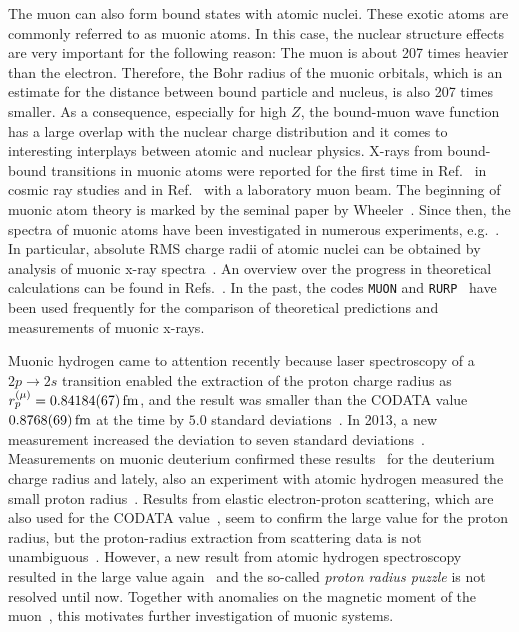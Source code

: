 The muon can also form bound states with atomic nuclei. These exotic atoms are commonly referred to as muonic atoms. In this case, the nuclear structure effects are very important for the following reason: The muon is about 207 times heavier than the electron. Therefore, the Bohr radius of the muonic orbitals, which is an estimate for the distance between bound particle and nucleus, is also 207 times smaller. As a consequence, especially for high $Z$, the bound-muon wave function has a large overlap with the nuclear charge distribution and it comes to interesting interplays between atomic and nuclear physics. X-rays from bound-bound transitions in muonic atoms were reported for the first time in Ref.~\cite{chang1949} in cosmic ray studies and in Ref.~\cite{fitch1953} with a laboratory muon beam. The beginning of muonic atom theory is marked by the seminal paper by Wheeler~\cite{wheeler1949}.  Since then, the spectra of muonic atoms have been investigated in numerous experiments, e.g.~\cite{hitlin1970,zehnder1975,powers1976,Yamazaki1978,tanaka1983,tanaka1984,tanaka1984_2,Bergem1988,
powers1977}. In particular, absolute RMS charge radii of atomic nuclei can be obtained by analysis of muonic x-ray spectra~\cite{FRICKE1995}. An overview over the progress in theoretical calculations can be found in Refs.~\cite{BorieRinker1982,Devons1995,wu1969}. In the past, the codes \texttt{MUON} and \texttt{RURP}~\cite{rinker1979} have been used frequently for the comparison of theoretical predictions and measurements of muonic x-rays.

Muonic hydrogen came to attention recently because laser spectroscopy of a \mbox{\small{$2p\rightarrow 2s$}} transition enabled the extraction of the proton charge radius as $r_p^{(\mu)}=0.84184(67)\,\rm{fm}$, and the result was smaller than the CODATA value $0.8768(69)\,\rm{fm}$ at the time by $5.0$ standard deviations~\cite{Pohl2010}. In 2013, a new measurement increased the deviation to seven standard deviations~\cite{antognini2013}. Measurements on muonic deuterium confirmed these results~\cite{pohl2016} for the deuterium charge radius and lately, also an experiment with atomic hydrogen measured the small proton radius~\cite{beyer2017}.
Results from elastic electron-proton scattering, which are also used for the CODATA value~\cite{CODATA2014}, seem to confirm the large value for the proton radius, but the proton-radius extraction from scattering data is not unambiguous~\cite{arrington2015}. However, a new result from atomic hydrogen spectroscopy resulted in the large value again~\cite{fleurbaey2018} and the so-called \textit{proton radius puzzle} is not resolved until now. Together with anomalies on the magnetic moment of the muon~\cite{bennett2006}, this motivates further investigation of muonic systems.

